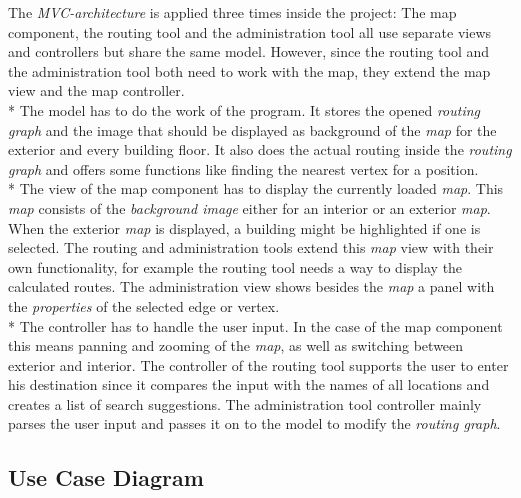 The \textit{MVC-architecture} is applied three times inside the project: The map component, the routing tool and the administration tool all use separate views and controllers but share the same model. However, since the routing tool and the administration tool both need to work with the map, they extend the map view and the map controller. \\*
The model has to do the work of the program. It stores the opened \textit{routing graph} and the image that should be displayed as background of the \textit{map} for the exterior and every building floor. It also does the actual routing inside the \textit{routing graph} and offers some functions like finding the nearest vertex for a position. \\*
The view of the map component has to display the currently loaded \textit{map}. This \textit{map} consists of the \textit{background image} either for an interior or an exterior \textit{map}. When the exterior \textit{map} is displayed, a building might be highlighted if one is selected. The routing and administration tools extend this \textit{map} view with their own functionality, for example the routing tool needs a way to display the calculated routes. The administration view shows besides the \textit{map} a panel with the \textit{properties} of the selected edge or vertex.\\*
The controller has to handle the user input. In the case of the map component this means panning and zooming of the \textit{map}, as well as switching between exterior and interior. The controller of the routing tool supports the user to enter his destination since it compares the input with the names of all locations and creates a list of search suggestions. The administration tool controller mainly parses the user input and passes it on to the model to modify the \textit{routing graph}.

\subsection{Use Case Diagram}

